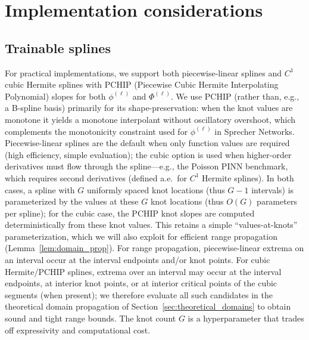 \documentclass{article}
\theoremstyle{plain}
\theoremstyle{definition}
\theoremstyle{remark}
\begin{document}
\section{Implementation considerations}\label{sec:implementation}

\subsection{Trainable splines}

For practical implementations, we support both piecewise-linear splines and $C^1$ cubic Hermite splines with \textsc{PCHIP} (Piecewise Cubic Hermite Interpolating Polynomial) slopes for both $\phi^{(\ell)}$ and $\Phi^{(\ell)}$. We use \textsc{PCHIP} (rather than, e.g., a B-spline basis) primarily for its shape-preservation: when the knot values are monotone it yields a monotone interpolant without oscillatory overshoot, which complements the monotonicity constraint used for $\phi^{(\ell)}$ in Sprecher Networks. Piecewise-linear splines are the default when only function values are required (high efficiency, simple evaluation); the cubic option is used when higher-order derivatives must flow through the spline---e.g., the Poisson PINN benchmark, which requires second derivatives (defined a.e.\ for $C^1$ Hermite splines). In both cases, a spline with $G$ uniformly spaced knot locations (thus $G-1$ intervals) is parameterized by the values at these $G$ knot locations (thus $O(G)$ parameters per spline); for the cubic case, the \textsc{PCHIP} knot slopes are computed deterministically from these knot values. This retains a simple ``values-at-knots'' parameterization, which we will also exploit for efficient range propagation (Lemma~\ref{lem:domain_prop}). For range propagation, piecewise-linear extrema on an interval occur at the interval endpoints and/or knot points. For cubic Hermite/\textsc{PCHIP} splines, extrema over an interval may occur at the interval endpoints, at interior knot points, or at interior critical points of the cubic segments (when present); we therefore evaluate all such candidates in the theoretical domain propagation of Section~\ref{sec:theoretical_domains} to obtain sound and tight range bounds. The knot count $G$ is a hyperparameter that trades off expressivity and computational cost.
\end{document}
